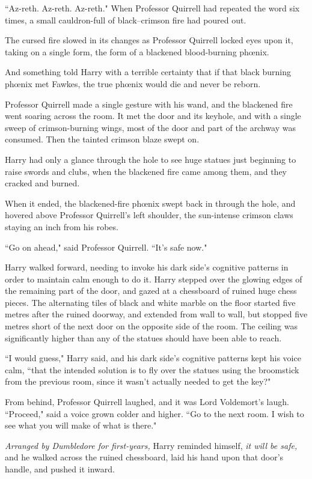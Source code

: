 ``Az-reth. Az-reth. Az-reth." When Professor Quirrell had repeated the word six times, a small cauldron-full of black--crimson fire had poured out.

The cursed fire slowed in its changes as Professor Quirrell locked eyes upon it, taking on a single form, the form of a blackened blood-burning phœnix.

And something told Harry with a terrible certainty that if that black burning phœnix met Fawkes, the true phœnix would die and never be reborn.

Professor Quirrell made a single gesture with his wand, and the blackened fire went soaring across the room. It met the door and its keyhole, and with a single sweep of crimson-burning wings, most of the door and part of the archway was consumed. Then the tainted crimson blaze swept on.

Harry had only a glance through the hole to see huge statues just beginning to raise swords and clubs, when the blackened fire came among them, and they cracked and burned.

When it ended, the blackened-fire phœnix swept back in through the hole, and hovered above Professor Quirrell's left shoulder, the sun-intense crimson claws staying an inch from his robes.

``Go on ahead," said Professor Quirrell. ``It's safe now."

Harry walked forward, needing to invoke his dark side's cognitive patterns in order to maintain calm enough to do it. Harry stepped over the glowing edges of the remaining part of the door, and gazed at a chessboard of ruined huge chess pieces. The alternating tiles of black and white marble on the floor started five metres after the ruined doorway, and extended from wall to wall, but stopped five metres short of the next door on the opposite side of the room. The ceiling was significantly higher than any of the statues should have been able to reach.

``I would guess," Harry said, and his dark side's cognitive patterns kept his voice calm, ``that the intended solution is to fly over the statues using the broomstick from the previous room, since it wasn't actually needed to get the key?"

From behind, Professor Quirrell laughed, and it was Lord Voldemort's laugh. ``Proceed," said a voice grown colder and higher. ``Go to the next room. I wish to see what you will make of what is there."

\emph{Arranged by Dumbledore for first-years,} Harry reminded himself, \emph{it \emph{will} be safe,} and he walked across the ruined chessboard, laid his hand upon that door's handle, and pushed it inward.

